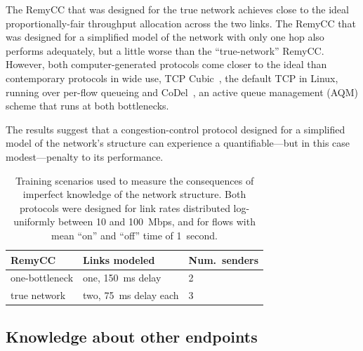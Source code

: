 

The RemyCC that was designed for the true network achieves close to
the ideal proportionally-fair throughput allocation across the two
links. The RemyCC that was designed for a simplified model of the
network with only one hop also performs adequately, but a little worse
than the ``true-network'' RemyCC. However, both computer-generated
protocols come closer to the ideal than contemporary protocols in wide
use, TCP Cubic~\cite{cubic}, the default TCP in Linux, running over
per-flow queueing and CoDel~\cite{CoDel}, an active queue management
(AQM) scheme that runs at both bottlenecks.

The results suggest that a congestion-control protocol designed for a
simplified model of the network's structure can experience a
quantifiable---but in this case modest---penalty to its performance.

\begin{table}
\caption{Training scenarios used to measure the consequences of imperfect
  knowledge of the network structure. Both protocols were designed for
  link rates distributed log-uniformly between 10 and 100~Mbps, and
  for flows with mean ``on'' and ``off'' time of 1~second.
}
\label{table:topology-training}
\begin{center}
\begin{tabular}{l|l|l}
\bf RemyCC & \bf Links modeled & \bf Num.~senders \\
\hline
one-bottleneck & one, 150~ms delay & 2 \\
true network & two, 75~ms delay each & 3 \\
\end{tabular}
\end{center}
\end{table}

\subsection{Knowledge about other endpoints}

